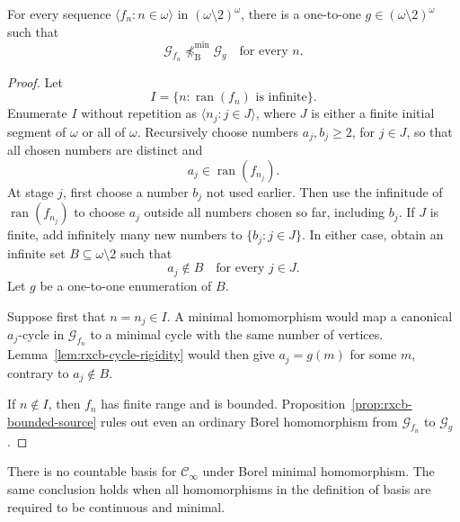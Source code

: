 \begin{lemma}
\label{lem:rxcb-minimal-diagonal}
For every sequence $\langle f_n:n\in\omega\rangle$ in
$(\omega\setminus2)^\omega$, there is a one-to-one
$g\in(\omega\setminus2)^\omega$ such that
\[
  \mathcal G_{f_n}\not\preceq^{\min}_{\mathrm B}\mathcal G_g
  \quad\text{for every }n.
\]
\end{lemma}

\begin{proof}
Let
\[
  I=\{n:\operatorname{ran}(f_n)\text{ is infinite}\}.
\]
Enumerate $I$ without repetition as $\langle n_j:j\in J\rangle$,
where $J$ is either a finite initial segment of $\omega$ or all of
$\omega$.  Recursively choose numbers $a_j,b_j\geq2$, for $j\in J$,
so that all chosen numbers are distinct and
\[
  a_j\in\operatorname{ran}(f_{n_j}).
\]
At stage $j$, first choose a number $b_j$ not used earlier.  Then use
the infinitude of $\operatorname{ran}(f_{n_j})$ to choose $a_j$
outside all numbers chosen so far, including $b_j$.  If $J$ is finite,
add infinitely many new numbers to $\{b_j:j\in J\}$.  In either case,
obtain an infinite set $B\subseteq\omega\setminus2$ such that
\[
  a_j\notin B\quad\text{for every }j\in J.
\]
Let $g$ be a one-to-one enumeration of $B$.

Suppose first that $n=n_j\in I$.  A minimal homomorphism would map a
canonical $a_j$-cycle in $\mathcal G_{f_n}$ to a minimal cycle with the
same number of vertices.  Lemma~\ref{lem:rxcb-cycle-rigidity} would
then give $a_j=g(m)$ for some $m$, contrary to $a_j\notin B$.

If $n\notin I$, then $f_n$ has finite range and is bounded.
Proposition~\ref{prop:rxcb-bounded-source} rules out even an ordinary
Borel homomorphism from $\mathcal G_{f_n}$ to $\mathcal G_g$.
\end{proof}

\begin{theorem}
\label{thm:rxcb-no-countable-minimal-basis}
There is no countable basis for $\mathcal C_\infty$ under Borel
minimal homomorphism.  The same conclusion holds when all
homomorphisms in the definition of basis are required to be continuous
and minimal.
\end{theorem}


